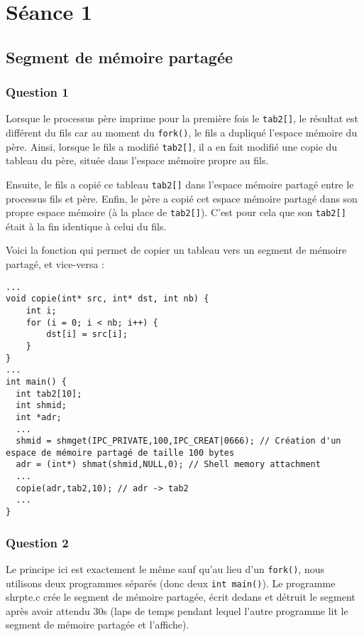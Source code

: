 \clanguage

\part{Séance 1}

\chapter{Segment de mémoire partagée}

\section{Question 1}

Lorsque le processus père imprime pour la première fois le \lstinline{tab2[]}, le résultat est différent du fils car au moment du \lstinline{fork()}, le fils a dupliqué l'espace mémoire du père. Ainsi, lorsque le fils a modifié \lstinline{tab2[]}, il a en fait modifié une copie du tableau du père, située dans l'espace mémoire propre au fils.

\medskip

Ensuite, le fils a copié ce tableau \lstinline{tab2[]} dans l'espace mémoire partagé entre le processus fils et père. Enfin, le père a copié cet espace mémoire partagé dans son propre espace mémoire (à la place de \lstinline{tab2[]}). C'est pour cela que son \lstinline{tab2[]} était à la fin identique à celui du fils.

\medskip
Voici la fonction qui permet de copier un tableau vers un segment de mémoire partagé, et vice-versa :
\begin{lstlisting}
...
void copie(int* src, int* dst, int nb) {
    int i;
    for (i = 0; i < nb; i++) {
        dst[i] = src[i];
    }
}
...
int main() {
  int tab2[10];
  int shmid;
  int *adr;
  ...
  shmid = shmget(IPC_PRIVATE,100,IPC_CREAT|0666); // Création d'un espace de mémoire partagé de taille 100 bytes
  adr = (int*) shmat(shmid,NULL,0); // Shell memory attachment
  ...
  copie(adr,tab2,10); // adr -> tab2
  ...
}
\end{lstlisting}

\section{Question 2}

Le principe ici est exactement le même sauf qu'au lieu d'un \lstinline{fork()}, nous utilisons deux programmes séparés (donc deux \lstinline{int main()}). Le programme shrpte.c crée le segment de mémoire partagée, écrit dedans et détruit le segment après avoir attendu 30s (laps de temps pendant lequel l'autre programme lit le segment de mémoire partagée et l'affiche).

